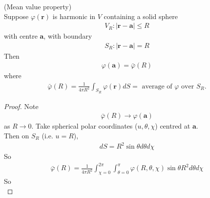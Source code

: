 \documentclass[a4paper]{article}
\begin{document}
\begin{thm} (Mean value property)\\
Suppose $\varphi\left(\mathbf{r}\right)$ is harmonic in $V$ containing a solid sphere
\begin{equation*}
\begin{aligned}
V_R: |\mathbf{r}-\mathbf{a}| \leq R
\end{aligned}
\end{equation*}
with centre $\mathbf{a}$, with boundary
\begin{equation*}
\begin{aligned}
S_R: |\mathbf{r}-\mathbf{a}| = R
\end{aligned}
\end{equation*}
Then
\begin{equation*}
\begin{aligned}
\varphi\left(\mathbf{a}\right) = \bar{\varphi}\left(R\right)
\end{aligned}
\end{equation*}
where
\begin{equation*}
\begin{aligned}
\bar{\varphi}\left(R\right) = \frac{1}{4\pi R^2}\int_{S_R} \varphi\left(\mathbf{r}\right) dS = \text{   average of  } \varphi \text{   over  } S_R.
\end{aligned}
\end{equation*}
\begin{proof}
Note
\begin{equation*}
\begin{aligned}
\bar{\varphi}\left(R\right) \to \varphi\left(\mathbf{a}\right)
\end{aligned}
\end{equation*}
as $R\to 0$. Take spherical polar coordinates ($u,\theta,\chi$) centred at $\mathbf{a}$.\\
Then on $S_R$ (i.e. $u=R$),
\begin{equation*}
\begin{aligned}
dS = R^2 \sin\theta d\theta d\chi
\end{aligned}
\end{equation*}
So
\begin{equation*}
\begin{aligned}
\bar{\varphi}\left(R\right) = \frac{1}{4\pi R^2}\int_{\chi=0}^{2\pi} \int_{\theta = 0}^\pi \varphi\left(R,\theta,\chi\right) \sin\theta R^2 d\theta d\chi
\end{aligned}
\end{equation*}
So 
\begin{equation*}

\end{equation*}
\end{proof}
\end{thm}
\end{document}

